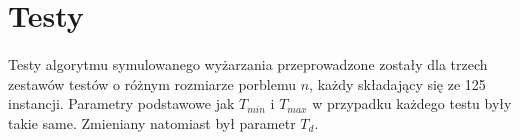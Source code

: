 \documentclass[wide,a4paper,titlepage,12pt] {article}
\begin{document}
\paragraph{}
\lstset{ %
    language=java,                %
    basicstyle=\scriptsize,       %
    numbers=left,                   %
    numberstyle=\scriptsize,      %
    stepnumber=10,                   %
    numbersep=9pt,                  %
    showspaces=false,               %
    showstringspaces=false,         %
    showtabs=false,                 %
    breaklines=true,                %
    }
    

\section{Testy}
\paragraph{}
Testy algorytmu symulowanego wyżarzania przeprowadzone zostały dla trzech zestawów testów o różnym rozmiarze porblemu $n$, każdy składający się ze 125 instancji. Parametry podstawowe jak $T_{min}$ i $T_{max}$ w przypadku każdego testu były takie same. Zmieniany natomiast był parametr $T_{d}$.
\end{document}

